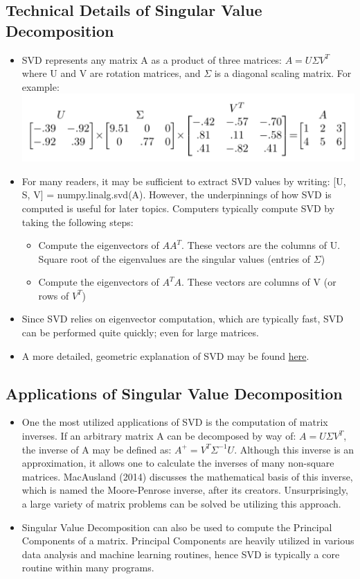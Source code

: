 \documentclass{article}
\begin{document}
\subsection{Technical Details of Singular Value Decomposition}
\begin{itemize}
\item SVD represents any matrix	A as a product of three	matrices: $A = U\Sigma V^T$ where U and V are rotation matrices, and $\Sigma$ is a diagonal scaling matrix.	For example:\\
\includegraphics[scale = 0.5]{usigv_example}
\item For many readers, it may be sufficient to extract SVD values by writing: [U, S, V] = numpy.linalg.svd(A). However, the underpinnings of how SVD is computed is useful for later topics. Computers typically compute SVD by taking the following steps:
	\begin{itemize}
    	\item Compute the eigenvectors of $AA^{T}$. These vectors are the columns of U. Square root of the eigenvalues are the singular values (entries of $\Sigma$)
        \item Compute the eigenvectors of $A^{T}A$. These vectors are columns of V (or rows of $V^{T}$)
    \end{itemize}
\item Since SVD relies on eigenvector computation, which are typically fast, SVD can be performed quite quickly; even for large matrices.
\item A more detailed, geometric explanation of SVD may be found 
\href{http://www.ams.org/samplings/feature-column/fcarc-svd}{here}.
\end{itemize}

\subsection{Applications of Singular Value Decomposition}
\begin{itemize}
\item One the most utilized applications of SVD is the computation of matrix inverses. If an arbitrary matrix A can be decomposed by way of: $A = U\Sigma V^T$, the inverse of A may be defined as: $A^{+} = V^T \Sigma^{-1}U$. Although this inverse is an approximation, it allows one to calculate the inverses of many non-square matrices. MacAusland (2014) discusses the mathematical basis of this inverse, which is named the Moore-Penrose inverse, after its creators\cite{moore-penrose}. Unsurprisingly, a large variety of matrix problems can be solved be utilizing this approach. 
\item Singular Value Decomposition can also be used to compute the Principal Components of a matrix. Principal Components are heavily utilized in various data analysis and machine learning routines, hence SVD is typically a core routine within many programs.
\end{itemize}
\end{document}

